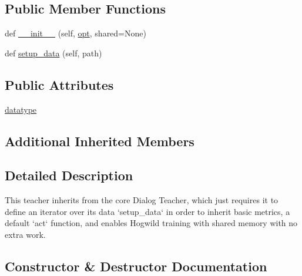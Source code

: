 \subsection*{Public Member Functions}
\begin{DoxyCompactItemize}
\item 
def \hyperlink{classparlai_1_1tasks_1_1ubuntu_1_1agents_1_1UbuntuTeacher_aa5a556a3369c3b20101179c6e3f63c2a}{\+\_\+\+\_\+init\+\_\+\+\_\+} (self, \hyperlink{classparlai_1_1core_1_1agents_1_1Teacher_a3ce6243860ce978a897922863ed32fa4}{opt}, shared=None)
\item 
def \hyperlink{classparlai_1_1tasks_1_1ubuntu_1_1agents_1_1UbuntuTeacher_ac8386ce4d46f4d3e8b296ac291ff4997}{setup\+\_\+data} (self, path)
\end{DoxyCompactItemize}
\subsection*{Public Attributes}
\begin{DoxyCompactItemize}
\item 
\hyperlink{classparlai_1_1tasks_1_1ubuntu_1_1agents_1_1UbuntuTeacher_ae664115e7a564e2a816adc8ecc6ea831}{datatype}
\end{DoxyCompactItemize}
\subsection*{Additional Inherited Members}


\subsection{Detailed Description}
\begin{DoxyVerb}This teacher inherits from the core Dialog Teacher, which just requires it to define
an iterator over its data `setup_data` in order to inherit basic metrics, a default
`act` function, and enables Hogwild training with shared memory with no extra work.
\end{DoxyVerb}
 

\subsection{Constructor \& Destructor Documentation}
\mbox{\label{classparlai_1_1tasks_1_1ubuntu_1_1agents_1_1UbuntuTeacher_aa5a556a3369c3b20101179c6e3f63c2a}} 
